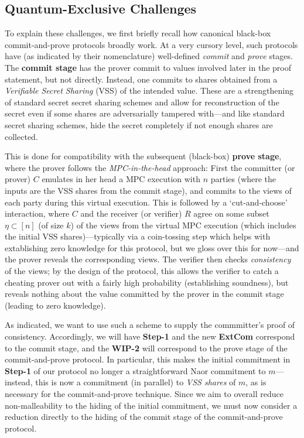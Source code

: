 \subsection{Quantum-Exclusive Challenges}
\label{sec:QE-chal}

To explain these challenges, we first briefly recall how canonical black-box commit-and-prove protocols broadly work. At a very cursory level, such protocols have (as indicated by their nomenclature) well-defined {\em commit} and {\em prove} stages. The {\bf commit stage} has the prover commit to values involved later in the proof statement, but not directly. Instead, one commits to shares obtained from a {\em Verifiable Secret Sharing} (VSS) of the intended value. These are a strengthening of standard secret secret sharing schemes and allow for reconstruction of the secret even if some shares are adversarially tampered with---and like standard secret sharing schemes, hide the secret completely if not enough shares are collected. 

This is done for compatibility with the subsequent (black-box) {\bf prove stage}, where the prover follows the {\em MPC-in-the-head} \cite{STOC:IKOS07,FOCS:GLOV12} approach: First the committer (or prover) $C$ emulates in her head a MPC execution with $n$ parties (where the inputs are the VSS shares from the commit stage), and commits to the views of each party during this virtual execution. This is followed by a `cut-and-choose' interaction, where $C$ and the receiver (or verifier) $R$ agree on some subset $\eta \subset [n]$ (of size $k$) of the views from the virtual MPC execution (which includes the initial VSS shares)---typically via a coin-tossing step which helps with extablishing zero knowledge for this protocol, but we gloss over this for now---and the prover reveals the corresponding views. The verifier then checks {\em consistency} of the views; by the design of the protocol, this allows the verifier to catch a cheating prover out with a fairly high probability (establishing soundness), but reveals nothing about the value committed by the prover in the commit stage (leading to zero knowledge).  


As indicated, we want to use such a scheme to supply the commmitter's proof of consistency. Accordingly, we will have {\bf Step-1} and the new {\bf ExtCom} correspond to the commit stage, and the {\bf WIP-2} will correspond to the prove stage of the commit-and-prove protocol. In particular, this makes the initial commitment in {\bf Step-1} of our protocol no longer a straightforward Naor commitment to $m$---instead, this is now a commitment (in parallel) to {\em VSS shares} of $m$, as is necessary for the commit-and-prove technique. Since we aim to overall reduce non-malleability to the hiding of the initial commitment, we must now consider a reduction directly to the hiding of the commit stage of the commit-and-prove protocol.  

